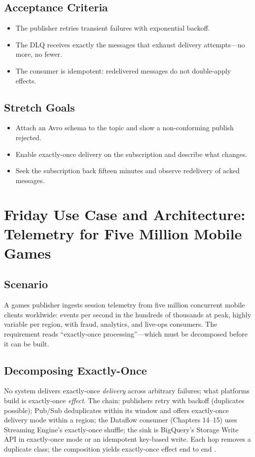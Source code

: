 \subsection*{Acceptance Criteria}
\begin{itemize}
    \item The publisher retries transient failures with exponential backoff.
    \item The DLQ receives exactly the messages that exhaust delivery attempts---no more, no fewer.
    \item The consumer is idempotent: redelivered messages do not double-apply effects.
\end{itemize}

\subsection*{Stretch Goals}
\begin{itemize}
    \item Attach an Avro schema to the topic and show a non-conforming publish rejected.
    \item Enable exactly-once delivery on the subscription and describe what changes.
    \item Seek the subscription back fifteen minutes and observe redelivery of acked messages.
\end{itemize}

\section{Friday Use Case and Architecture: Telemetry for Five Million Mobile Games}

\subsection{Scenario}
A games publisher ingests session telemetry from five million concurrent mobile clients worldwide: events per second in the hundreds of thousands at peak, highly variable per region, with fraud, analytics, and live-ops consumers. The requirement reads ``exactly-once processing''---which must be decomposed before it can be built.

\subsection{Decomposing Exactly-Once}
No system delivers exactly-once \emph{delivery} across arbitrary failures; what platforms build is exactly-once \emph{effect}. The chain: publishers retry with backoff (duplicates possible); Pub/Sub deduplicates within its window and offers exactly-once delivery mode within a region; the Dataflow consumer (Chapters 14--15) uses Streaming Engine's exactly-once shuffle; the sink is BigQuery's Storage Write API in exactly-once mode or an idempotent key-based write. Each hop removes a duplicate class; the composition yields exactly-once effect end to end \cite{akidau2015dataflow}.

